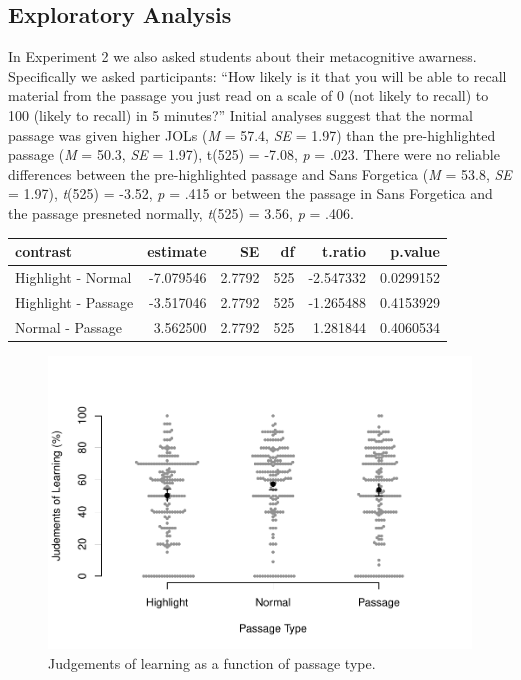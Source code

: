 \documentclass[english,pdf]{apa6}
\begin{document}
\hypertarget{exploratory-analysis}{%
\subsection{Exploratory Analysis}\label{exploratory-analysis}}

In Experiment 2 we also asked students about their metacognitive awarness. Specifically we asked participants: \enquote{How likely is it that you will be able to recall material from the passage you just read on a scale of 0 (not likely to recall) to 100 (likely to recall) in 5 minutes?} Initial analyses suggest that the normal passage was given higher JOLs (\emph{M} = 57.4, \emph{SE} = 1.97) than the pre-highlighted passage (\emph{M} = 50.3, \emph{SE} = 1.97), t(525) = -7.08, \emph{p} = .023. There were no reliable differences between the pre-highlighted passage and Sans Forgetica (\emph{M} = 53.8, \emph{SE} = 1.97), \emph{t}(525) = -3.52, \emph{p} = .415 or between the passage in Sans Forgetica and the passage presneted normally, \emph{t}(525) = 3.56, \emph{p} = .406.

\begin{tabular}{l|r|r|r|r|r}
\hline
contrast & estimate & SE & df & t.ratio & p.value\\
\hline
Highlight - Normal & -7.079546 & 2.7792 & 525 & -2.547332 & 0.0299152\\
\hline
Highlight - Passage & -3.517046 & 2.7792 & 525 & -1.265488 & 0.4153929\\
\hline
Normal - Passage & 3.562500 & 2.7792 & 525 & 1.281844 & 0.4060534\\
\hline
\end{tabular}

\begin{figure}

{\centering \includegraphics{SF_Paper_files/figure-latex/unnamed-chunk-4-1} 

}

\caption{Judgements of learning as a function of passage type.}\label{fig:unnamed-chunk-4}
\end{figure}
\end{document}
